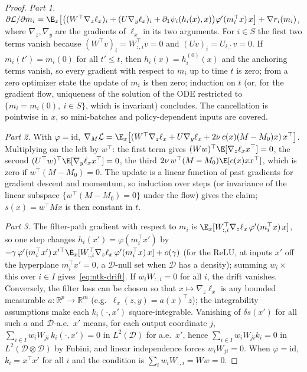 \begin{proof}
\emph{Part 1.} $\partial \mathcal{L}/\partial m_i = \E_x\big[\big((W^\top \nabla_z \ell_x)_i + (U \nabla_y \ell_x)_i + \partial_1\psi_i(h_i(x), x)\big)\varphi'(m_i^\top x)\, x\big] + \nabla r_i(m_i)$, where $\nabla_z, \nabla_y$ are the gradients of $\ell_x$ in its two arguments. For $i \in S$ the first two terms vanish because $(W^\top v)_i = W_{:,i}^\top v = 0$ and $(U v)_i = U_{i,:} v = 0$. If $m_i(t') = m_i(0)$ for all $t' \le t$, then $h_i(x) = h_i^{(0)}(x)$ and the anchoring terms vanish, so every gradient with respect to $m_i$ up to time $t$ is zero; from a zero optimizer state the update of $m_i$ is then zero; induction on $t$ (or, for the gradient flow, uniqueness of the solution of the ODE restricted to $\{m_i = m_i(0),\ i \in S\}$, which is invariant) concludes. The cancellation is pointwise in $x$, so mini-batches and policy-dependent inputs are covered.

\emph{Part 2.} With $\varphi = \mathrm{id}$, $\nabla_M \mathcal{L} = \E_x\big[(W^\top \nabla_z\ell_x + U \nabla_y \ell_x + 2\nu\, c(x) (M - M_0) x)\, x^\top\big]$. Multiplying on the left by $w^\top$: the first term gives $(Ww)^\top \E[\nabla_z \ell_x x^\top] = 0$, the second $(U^\top w)^\top \E[\nabla_y\ell_x x^\top] = 0$, the third $2\nu\, w^\top (M - M_0)\E[c(x) x x^\top]$, which is zero if $w^\top(M - M_0) = 0$. The update is a linear function of past gradients for gradient descent and momentum, so induction over steps (or invariance of the linear subspace $\{w^\top (M - M_0) = 0\}$ under the flow) gives the claim; $s(x) = w^\top M x$ is then constant in $t$.

\emph{Part 3.} The filter-path gradient with respect to $m_i$ is $\E_x[W_{:,i}^\top \nabla_z \ell_x\, \varphi'(m_i^\top x)\, x]$, so one step changes $h_i(x') = \varphi(m_i^\top x')$ by $-\gamma\, \varphi'(m_i^\top x')\, x'^\top \E_x[W_{:,i}^\top\nabla_z\ell_x\,\varphi'(m_i^\top x)\, x] + o(\gamma)$ (for the ReLU, at inputs $x'$ off the hyperplane $m_i^\top x' = 0$, a $\mathcal{D}$-null set when $\mathcal{D}$ has a density); summing $w_i \times$ this over $i \in I$ gives~\eqref{eq:ntk-drift}. If $w_i W_{:,i} = 0$ for all $i$, the drift vanishes. Conversely, the filter loss can be chosen so that $x \mapsto \nabla_z \ell_x$ is any bounded measurable $a : \mathbb{R}^p \to \mathbb{R}^m$ (e.g.\ $\ell_x(z, y) = a(x)^\top z$); the integrability assumptions make each $k_i(\cdot, x')$ square-integrable. Vanishing of $\delta s(x')$ for all such $a$ and $\mathcal{D}$-a.e.\ $x'$ means, for each output coordinate $j$, $\sum_{i \in I} w_i W_{ji}\, k_i(\cdot, x') = 0$ in $L^2(\mathcal{D})$ for a.e.\ $x'$, hence $\sum_{i \in I} w_i W_{ji} k_i = 0$ in $L^2(\mathcal{D} \otimes \mathcal{D})$ by Fubini, and linear independence forces $w_i W_{ji} = 0$. When $\varphi = \mathrm{id}$, $k_i = x^\top x'$ for all $i$ and the condition is $\sum_i w_i W_{:,i} = Ww = 0$.


\end{proof}
